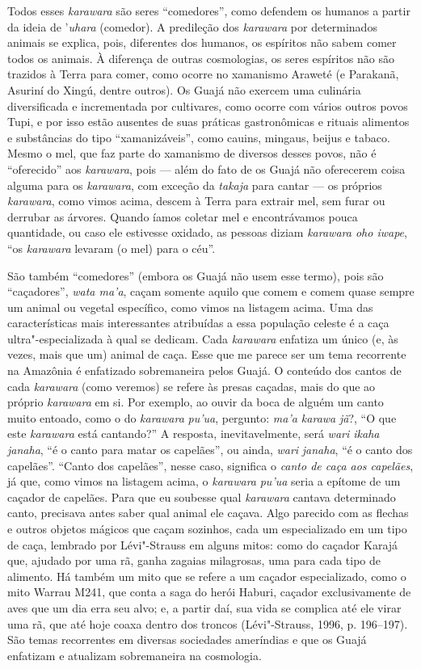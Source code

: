 Todos esses \emph{karawara} são seres ``comedores'', como defendem os
humanos a partir da ideia de '\emph{uhara} (comedor). A predileção dos
\emph{karawara} por determinados animais se explica, pois, diferentes
dos humanos, os espíritos não sabem comer todos os animais. À diferença
de outras cosmologias, os seres espíritos não são trazidos à Terra para
comer, como ocorre no xamanismo Araweté (e Parakanã, Asuriní do Xingú,
dentre outros). Os Guajá não exercem uma culinária diversificada e
incrementada por cultivares, como ocorre com vários outros povos Tupi, e
por isso estão ausentes de suas práticas gastronômicas e rituais
alimentos e substâncias do tipo ``xamanizáveis'', como cauins, mingaus,
beijus e tabaco. Mesmo o mel, que faz parte do xamanismo de diversos
desses povos, não é ``oferecido'' aos \emph{karawara}, pois --- além do fato
de os Guajá não oferecerem coisa alguma para os \emph{karawara}, com
exceção da \emph{takaja} para cantar --- os próprios \emph{karawara}, como
vimos acima, descem à Terra para extrair mel, sem furar ou derrubar as
árvores. Quando íamos coletar mel e encontrávamos pouca quantidade, ou
caso ele estivesse oxidado, as pessoas diziam \emph{karawara oho iwape},
``os \emph{karawara} levaram (o mel) para o céu''.

São também ``comedores'' (embora os Guajá não usem esse termo), pois são
``caçadores'', \emph{wata ma'a}, caçam somente aquilo que comem e comem
quase sempre um animal ou vegetal específico, como vimos na listagem
acima. Uma das características mais interessantes atribuídas a essa
população celeste é a caça ultra"-especializada à qual se dedicam. Cada
\emph{karawara} enfatiza um único (e, às vezes, mais que um) animal de
caça. Esse que me parece ser um tema recorrente na Amazônia é enfatizado
sobremaneira pelos Guajá. O conteúdo dos cantos de cada \emph{karawara}
(como veremos) se refere às presas caçadas, mais do que ao próprio
\emph{karawara} em si. Por exemplo, ao ouvir da boca de alguém um canto
muito entoado, como o do \emph{karawara} \emph{pu'ua}, pergunto:
\emph{ma'a karawa} \emph{jã}?, ``O que este \emph{karawara} está
cantando?'' A resposta, inevitavelmente, será \emph{wari ikaha}
\emph{janaha}, ``é o canto para matar os capelães'', ou ainda, \emph{wari}
\emph{janaha}, ``é o canto dos capelães''. ``Canto dos capelães'', nesse
caso, significa o \emph{canto de caça aos capelães}, já que, como vimos
na listagem acima, o \emph{karawara} \emph{pu'ua} seria a epítome de um
caçador de capelães. Para que eu soubesse qual \emph{karawara} cantava
determinado canto, precisava antes saber qual animal ele caçava. Algo
parecido com as flechas e outros objetos mágicos que caçam sozinhos,
cada um especializado em um tipo de caça, lembrado por Lévi"-Strauss em
alguns mitos: como do caçador Karajá que, ajudado por uma rã, ganha
zagaias milagrosas, uma para cada tipo de alimento. Há também um mito
que se refere a um caçador especializado, como o mito Warrau M241, que
conta a saga do herói Haburi, caçador exclusivamente de aves que um dia
erra seu alvo; e, a partir daí, sua vida se complica até ele virar uma
rã, que até hoje coaxa dentro dos troncos (Lévi"-Strauss, 1996, p.
196--197). São temas recorrentes em diversas sociedades ameríndias e que
os Guajá enfatizam e atualizam sobremaneira na cosmologia.

